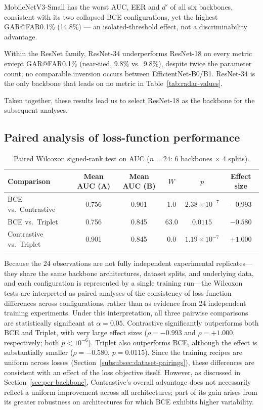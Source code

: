 MobileNetV3-Small has the worst AUC, EER and $d'$ of all six backbones,
consistent with its two collapsed BCE configurations, yet the highest
GAR@FAR0.1\% (14.8\%) — an isolated-threshold effect, not a
discriminability advantage.

Within the ResNet family, ResNet-34 underperforms ResNet-18 on every
metric except GAR@FAR0.1\% (near-tied, 9.8\% vs.\ 9.8\%), despite twice
the parameter count; no comparable inversion occurs between
EfficientNet-B0/B1. ResNet-34 is the only backbone that leads on no
metric in Table~\ref{tab:radar-values}.

Taken together, these results lead us to select ResNet-18 as the backbone for the subsequent analyses.


\subsection{Paired analysis of loss-function performance}
\label{sec:significance}

\begin{table}[htbp]
  \centering
  \caption{Paired Wilcoxon signed-rank test on AUC ($n=24$: 6 backbones
  $\times$ 4 splits).}
  \label{tab:wilcoxon}
  \begin{tabular}{lccccc}
    \toprule
    Comparison & Mean AUC (A) & Mean AUC (B) & $W$ & $p$ & Effect size \\
    \midrule
    BCE vs.\ Contrastive     & 0.756 & 0.901 & 1.0  & $2.38\times10^{-7}$ & $-0.993$ \\
    BCE vs.\ Triplet         & 0.756 & 0.845 & 63.0 & $0.0115$             & $-0.580$ \\
    Contrastive vs.\ Triplet & 0.901 & 0.845 & 0.0  & $1.19\times10^{-7}$ & $+1.000$ \\
    \bottomrule
  \end{tabular}
\end{table}

Because the 24 observations are not fully independent experimental replicates---they share the same backbone architectures, dataset splits, and underlying data, and each configuration is represented by a single training run---the Wilcoxon tests are interpreted as paired analyses of the consistency of loss-function differences across configurations, rather than as evidence from 24 independent training experiments. Under this interpretation, all three pairwise comparisons are statistically significant at $\alpha=0.05$. Contrastive significantly outperforms both BCE and Triplet, with very large effect sizes ($\rho=-0.993$ and $\rho=+1.000$, respectively; both $p<10^{-6}$). Triplet also outperforms BCE, although the effect is substantially smaller ($\rho=-0.580$, $p=0.0115$). Since the training recipes are uniform across losses (Section~\ref{subsubsec:dataset-pairings}), these differences are consistent with an effect of the loss objective itself. However, as discussed in Section~\ref{sec:per-backbone}, Contrastive's overall advantage does not necessarily reflect a uniform improvement across all architectures; part of its gain arises from its greater robustness on architectures for which BCE exhibits higher variability.

